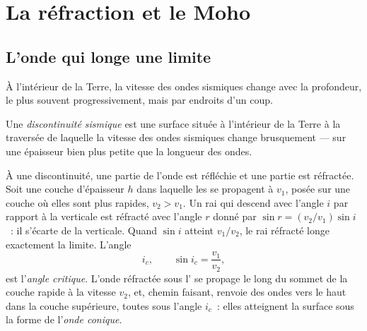 \section{La réfraction et le Moho}\label{sec:g11:seismic-structure:moho}

\subsection{L'onde qui longe une limite}

À l'intérieur de la Terre, la vitesse des ondes sismiques change avec la
profondeur, le plus souvent progressivement, mais par endroits d'un coup.

\begin{definition}\label{def:g11:seismic-structure:discontinuity}
Une \emph{discontinuité sismique}
est une surface située à l'intérieur de la Terre à la traversée
de laquelle la vitesse des ondes sismiques change brusquement --- sur une
épaisseur bien plus petite que la longueur des ondes.
\end{definition}

À une discontinuité, une partie de l'onde est réfléchie et une partie est
réfractée. Soit une couche d'épaisseur $h$ dans laquelle les  se
propagent à $v_1$, posée sur une couche où elles sont plus rapides,
$v_2 > v_1$. Un rai qui descend avec l'angle $i$ par rapport à la verticale
est réfracté avec l'angle $r$ donné par $\sin r = (v_2/v_1)\sin
i$~: il s'écarte de la verticale. Quand $\sin i$ atteint $v_1/v_2$, le rai
réfracté longe exactement la limite. L'angle
\[
  i_c, \qquad \sin i_c = \frac{v_1}{v_2},
\]
est l'\emph{angle critique}. L'onde réfractée sous
l' se propage le long du sommet de la couche rapide à la
vitesse $v_2$, et, chemin faisant, renvoie des ondes vers le haut dans la
couche supérieure, toutes sous l'angle
$i_c$~: elles atteignent la surface sous la forme de l'\emph{onde
conique}.

